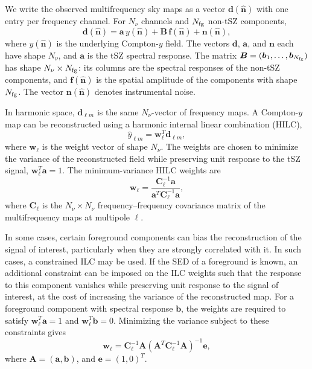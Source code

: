 \documentclass[aps,prd,twocolumn,superscriptaddress,nofootinbib,floatfix]{revtex4-2}
\begin{document}
We write the observed multifrequency sky maps as a vector $\bm{d}(\hat{\bm{n}})$ with one entry per frequency channel. For $N_\nu$ channels and $N_{\rm fg}$ non-tSZ components,
\begin{equation}
\bm{d}(\hat{\bm{n}})
=
\bm{a}\,y(\hat{\bm{n}})
+
\bm{B}\,\bm{f}(\hat{\bm{n}})
+
\bm{n}(\hat{\bm{n}}),
\label{eq:multifrequency_data_model}
\end{equation}
where $y(\hat{\bm{n}})$ is the underlying Compton-$y$ field. The vectors $\bm{d}$, $\bm{a}$, and $\bm{n}$ each have shape $N_\nu$, and $\bm{a}$ is the tSZ spectral response. The matrix
$\bm{B}=(\bm{b}_1,\ldots,\bm{b}_{N_{\rm fg}})$
has shape $N_\nu\times N_{\rm fg}$: its columns are the spectral responses of the non-tSZ components, and $\bm{f}(\hat{\bm{n}})$ is the spatial amplitude of the components with shape $N_{\rm fg}$. The vector $\bm{n}(\hat{\bm{n}})$ denotes instrumental noise. 

In harmonic space, $\bm{d}_{\ell m}$ is the same $N_\nu$-vector of frequency maps. A Compton-$y$ map can be reconstructed using a harmonic internal linear combination (HILC),
\begin{equation}
\hat{y}_{\ell m}
=
\bm{w}_{\ell}^{T}\bm{d}_{\ell m},
\label{eq:hilc_estimator}
\end{equation}
where $\bm{w}_{\ell}$ is the weight vector of shape $N_\nu$. The weights are chosen to minimize the variance of the reconstructed field while preserving unit response to the tSZ signal, $\bm{w}_{\ell}^{T}\bm{a}=1$. The minimum-variance HILC weights are
\begin{equation}
\bm{w}_{\ell}
=
\frac{
\bm{C}_{\ell}^{-1}\bm{a}
}{
\bm{a}^{T}\bm{C}_{\ell}^{-1}\bm{a}
},
\label{eq:hilc_weights}
\end{equation}
where $\bm{C}_{\ell}$ is the $N_\nu\times N_\nu$ frequency--frequency covariance matrix of the multifrequency maps at multipole $\ell$.

In some cases, certain foreground components can bias the reconstruction of the signal of interest, particularly when they are strongly correlated with it. In such cases, a constrained ILC may be used. If the SED of a foreground is known, an additional constraint can be imposed on the ILC weights such that the response to this component vanishes while preserving unit response to the signal of interest, at the cost of increasing the variance of the reconstructed map. For a foreground component with spectral response $\bm{b}$, the weights are required to satisfy $\bm{w}_{\ell}^{T}\bm{a}=1$ and $\bm{w}_{\ell}^{T}\bm{b}=0$. Minimizing the variance subject to these constraints gives
\begin{equation}
\bm{w}_{\ell}
=
\bm{C}_{\ell}^{-1}\bm{A}
\left(
\bm{A}^{T}\bm{C}_{\ell}^{-1}\bm{A}
\right)^{-1}
\bm{e},
\label{eq:constrained_hilc_weights}
\end{equation}
where $\bm{A}=(\bm{a},\bm{b})$, and $\bm{e}=(1,0)^{T}$.
\end{document}
